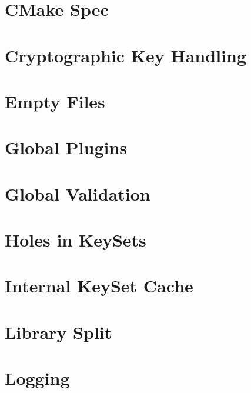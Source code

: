 \documentclass[twoside]{book}
\newcommand{\+}{\discretionary{\mbox{\scriptsize$\hookleftarrow$}}{}{}}
\begin{document}
\chapter{C\+Make Spec}
\label{doc_decisions_cmake_spec_md}
\hypertarget{doc_decisions_cmake_spec_md}{}

\chapter{Cryptographic Key Handling}
\label{doc_decisions_cryptograhic_key_handling_md}
\hypertarget{doc_decisions_cryptograhic_key_handling_md}{}

\chapter{Empty Files}
\label{doc_decisions_empty_files_md}
\hypertarget{doc_decisions_empty_files_md}{}

\chapter{Global Plugins}
\label{doc_decisions_global_plugins_md}
\hypertarget{doc_decisions_global_plugins_md}{}

\chapter{Global Validation}
\label{doc_decisions_global_validation_md}
\hypertarget{doc_decisions_global_validation_md}{}

\chapter{Holes in Key\+Sets}
\label{doc_decisions_holes_md}
\hypertarget{doc_decisions_holes_md}{}

\chapter{Internal Key\+Set Cache}
\label{doc_decisions_internal_cache_md}
\hypertarget{doc_decisions_internal_cache_md}{}

\chapter{Library Split}
\label{doc_decisions_library_split_md}
\hypertarget{doc_decisions_library_split_md}{}

\chapter{Logging}
\label{doc_decisions_logging_md}
\hypertarget{doc_decisions_logging_md}{}

\end{document}
